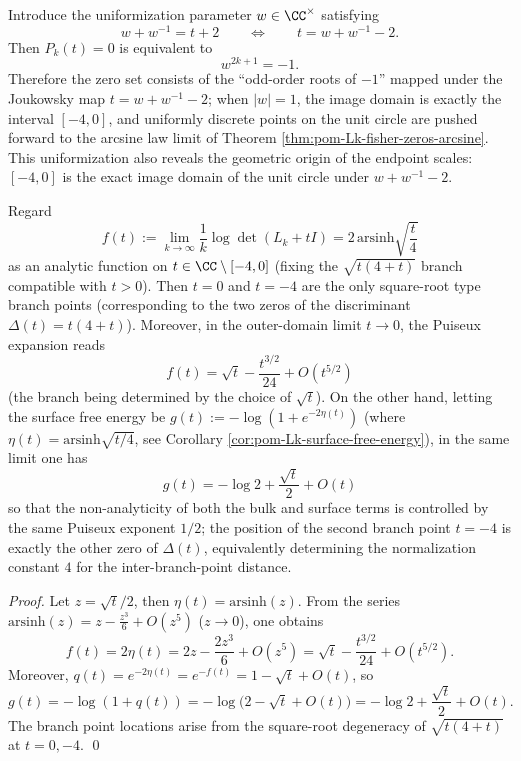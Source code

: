 \begin{remark}\label{rem:pom-Lk-fisher-zeros-uniformization}
Introduce the uniformization parameter \(w\in\CC^\times\) satisfying
\[
w+w^{-1}=t+2
\qquad\Longleftrightarrow\qquad
t=w+w^{-1}-2.
\]
Then \(P_k(t)=0\) is equivalent to
\[
w^{2k+1}=-1.
\]
Therefore the zero set consists of the ``odd-order roots of \(-1\)'' mapped under the Joukowsky map \(t=w+w^{-1}-2\);
when \(|w|=1\), the image domain is exactly the interval \([-4,0]\), and uniformly discrete points on the unit circle are pushed forward to the arcsine law limit of Theorem \ref{thm:pom-Lk-fisher-zeros-arcsine}.
This uniformization also reveals the geometric origin of the endpoint scales: \([-4,0]\) is the exact image domain of the unit circle under \(w+w^{-1}-2\).
\end{remark}

\begin{proposition}[Square-root branching at the critical endpoints: Puiseux exponent rigidity at \texorpdfstring{$t=0$}{t=0} and \texorpdfstring{$t=-4$}{t=-4}]\label{prop:pom-Lk-branch-puiseux}
Regard
\[
f(t):=\lim_{k\to\infty}\frac{1}{k}\log\det(L_k+tI)
=2\,\mathrm{arsinh}\sqrt{\frac{t}{4}}
\]
as an analytic function on \(t\in\CC\setminus[-4,0]\) (fixing the \(\sqrt{t(4+t)}\) branch compatible with \(t>0\)).
Then \(t=0\) and \(t=-4\) are the only square-root type branch points (corresponding to the two zeros of the discriminant \(\Delta(t)=t(4+t)\)).
Moreover, in the outer-domain limit \(t\to 0\), the Puiseux expansion reads
\[
\boxed{\;
f(t)=\sqrt{t}-\frac{t^{3/2}}{24}+O(t^{5/2})\;}
\]
(the branch being determined by the choice of \(\sqrt{t}\)).
On the other hand, letting the surface free energy be \(g(t):=-\log(1+e^{-2\eta(t)})\) (where \(\eta(t)=\mathrm{arsinh}\sqrt{t/4}\), see Corollary \ref{cor:pom-Lk-surface-free-energy}), in the same limit one has
\[
\boxed{\;
g(t)=-\log 2+\frac{\sqrt{t}}{2}+O(t)\;}
\]
so that the non-analyticity of both the bulk and surface terms is controlled by the same Puiseux exponent \(1/2\); the position of the second branch point \(t=-4\) is exactly the other zero of \(\Delta(t)\), equivalently determining the normalization constant \(4\) for the inter-branch-point distance.
\end{proposition}

\begin{proof}
Let \(z=\sqrt{t}/2\), then \(\eta(t)=\mathrm{arsinh}(z)\).
From the series \(\mathrm{arsinh}(z)=z-\frac{z^3}{6}+O(z^5)\) (\(z\to 0\)), one obtains
\[
f(t)=2\eta(t)=2z-\frac{2z^3}{6}+O(z^5)
=\sqrt{t}-\frac{t^{3/2}}{24}+O(t^{5/2}).
\]
Moreover, \(q(t)=e^{-2\eta(t)}=e^{-f(t)}=1-\sqrt{t}+O(t)\), so
\[
g(t)=-\log(1+q(t))
=-\log\!\bigl(2-\sqrt{t}+O(t)\bigr)
=-\log2+\frac{\sqrt{t}}{2}+O(t).
\]
The branch point locations arise from the square-root degeneracy of \(\sqrt{t(4+t)}\) at \(t=0,-4\). \qed
\end{proof}

